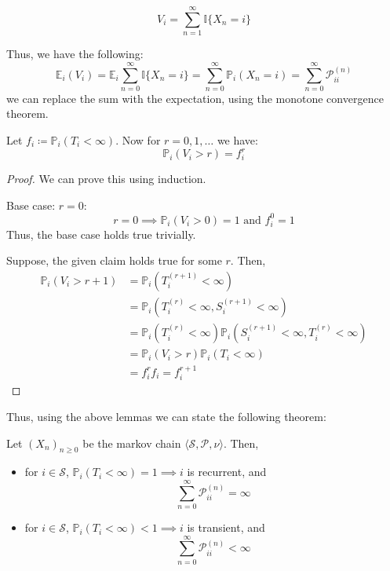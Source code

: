 \begin{definition}
    \[
        V_i = \sum_{n=1}^{\infty} \mathbb{I} \{X_n = i\}
    \]
\end{definition}
Thus, we have the following:
\[
    \mathbb{E}_i (V_i) = \mathbb{E}_i \sum_{n=0}^{\infty} \mathbb{I} \{X_n = i\} = 
    \sum_{n=0}^{\infty} \mathbb{P}_i (X_n = i) = \sum _{n=0}^{\infty} \mathcal{P}_{ii}^{(n)}
\]
we can replace the sum with the expectation, using the monotone convergence theorem.
\begin{lemma}
    Let \(f_i \coloneqq \mathbb{P} _i(T_i < \infty )\). Now for \(r = 0,1,\dots \) we have:
    \[
        \mathbb{P} _i (V_i > r) = f_i^r
    \] 
\end{lemma}
\begin{proof}
    We can prove this using induction.
    
    Base case: \(r = 0\):
    \[
        r = 0 \implies  \mathbb{P} _i (V_i > 0) = 1 \text{ and }  f_i^0 = 1
    \]
    Thus, the base case holds true trivially.

    Suppose, the given claim holds true for some \(r\). Then,
    \[
        \begin{aligned}
            \mathbb{P} _i (V_i > r+1) &= \mathbb{P}_i (T_i^{(r+1)} < \infty ) \\
            &= \mathbb{P}_i (T_i^{(r)} < \infty, S_i^{(r+1)} < \infty) \\
            &= \mathbb{P}_i (T_i^{(r)} < \infty) \mathbb{P}_i (S_i^{(r+1)} < \infty, T_i^{(r)} < \infty) \\
            &= \mathbb{P} _i (V_i > r) \mathbb{P}_i (T_i < \infty) \\
            &= f_i^r f_i  = f_i^{r+1}
        \end{aligned}
    \] 
\end{proof}
Thus, using the above lemmas we can state the following theorem:
\begin{theorem}
    Let \((X_n)_{n \geq 0}\) be the markov chain \(\langle \mathcal{S} , \mathcal{P} , \nu \rangle\).
    Then,
    \begin{itemize}
        \item for \(i \in \mathcal{S} \), \(\mathbb{P}_i (T_i < \infty)  = 1 \implies i\) is recurrent, and
        \[
            \sum_{n = 0}^{\infty} \mathcal{P}_{ii}^{(n)} = \infty  
        \]
        \item for \(i \in \mathcal{S} \), \(\mathbb{P}_i (T_i < \infty)  < 1 \implies i\) is transient, and
        \[
            \sum_{n = 0}^{\infty} \mathcal{P}_{ii}^{(n)} < \infty
        \]
    \end{itemize}
\end{theorem}
